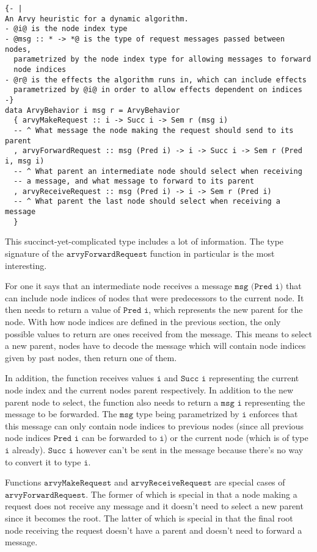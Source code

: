 \documentclass[a4paper, oneside]{discothesis}
\begin{document}
\begin{verbatim}
{- |
An Arvy heuristic for a dynamic algorithm.
- @i@ is the node index type
- @msg :: * -> *@ is the type of request messages passed between nodes,
  parametrized by the node index type for allowing messages to forward
  node indices
- @r@ is the effects the algorithm runs in, which can include effects
  parametrized by @i@ in order to allow effects dependent on indices
-}
data ArvyBehavior i msg r = ArvyBehavior
  { arvyMakeRequest :: i -> Succ i -> Sem r (msg i)
  -- ^ What message the node making the request should send to its parent
  , arvyForwardRequest :: msg (Pred i) -> i -> Succ i -> Sem r (Pred i, msg i)
  -- ^ What parent an intermediate node should select when receiving
  -- a message, and what message to forward to its parent
  , arvyReceiveRequest :: msg (Pred i) -> i -> Sem r (Pred i)
  -- ^ What parent the last node should select when receiving a message
  }
\end{verbatim}

This succinct-yet-complicated type includes a lot of information. The type signature of the $\texttt{arvyForwardRequest}$ function in particular is the most interesting.

For one it says that an intermediate node receives a message $\texttt{msg (Pred i)}$ that can include node indices of nodes that were predecessors to the current node. It then needs to return a value of $\texttt{Pred i}$, which represents the new parent for the node. With how node indices are defined in the previous section, the only possible values to return are ones received from the message. This means to select a new parent, nodes have to decode the message which will contain node indices given by past nodes, then return one of them.

In addition, the function receives values $\texttt{i}$ and $\texttt{Succ i}$ representing the current node index and the current nodes parent respectively. In addition to the new parent node to select, the function also needs to return a $\texttt{msg i}$ representing the message to be forwarded. The $\texttt{msg}$ type being parametrized by $\texttt{i}$ enforces that this message can only contain node indices to previous nodes (since all previous node indices $\texttt{Pred i}$ can be forwarded to $\texttt{i}$) or the current node (which is of type $\texttt{i}$ already). $\texttt{Succ i}$ however can't be sent in the message because there's no way to convert it to type $\texttt{i}$.

Functions $\texttt{arvyMakeRequest}$ and $\texttt{arvyReceiveRequest}$ are special cases of $\texttt{arvyForwardRequest}$. The former of which is special in that a node making a request does not receive any message and it doesn't need to select a new parent since it becomes the root. The latter of which is special in that the final root node receiving the request doesn't have a parent and doesn't need to forward a message.
\end{document}

